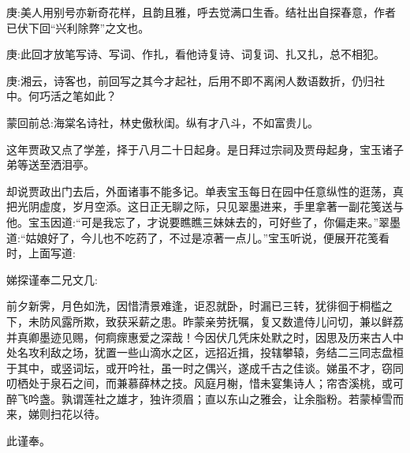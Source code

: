 
\begin{parag}
    \begin{note}庚:美人用别号亦新奇花样，且韵且雅，呼去觉满口生香。结社出自探春意，作者已伏下回“兴利除弊”之文也。\end{note}
\end{parag}


\begin{parag}
    \begin{note}庚:此回才放笔写诗、写词、作扎，看他诗复诗、词复词、扎又扎，总不相犯。\end{note}
\end{parag}


\begin{parag}
    \begin{note}庚:湘云，诗客也，前回写之其今才起社，后用不即不离闲人数语数折，仍归社中。何巧活之笔如此？\end{note}
\end{parag}


\begin{parag}
    \begin{note}蒙回前总:海棠名诗社，林史傲秋闺。纵有才八斗，不如富贵儿。\end{note}
\end{parag}


\begin{parag}
    这年贾政又点了学差，择于八月二十日起身。是日拜过宗祠及贾母起身，宝玉诸子弟等送至洒泪亭。
\end{parag}


\begin{parag}
    却说贾政出门去后，外面诸事不能多记。单表宝玉每日在园中任意纵性的逛荡，真把光阴虚度，岁月空添。这日正无聊之际，只见翠墨进来，手里拿著一副花笺送与他。宝玉因道:“可是我忘了，才说要瞧瞧三妹妹去的，可好些了，你偏走来。”翠墨道:“姑娘好了，今儿也不吃药了，不过是凉著一点儿。”宝玉听说，便展开花笺看时，上面写道:
\end{parag}


\begin{qute}
    娣探谨奉二兄文几:
    \begin{parag}
        前夕新霁，月色如洗，因惜清景难逢，讵忍就卧，时漏已三转，犹徘徊于桐槛之下，未防风露所欺，致获采薪之患。昨蒙亲劳抚嘱，复又数遣侍儿问切，兼以鲜荔并真卿墨迹见赐，何痌瘝惠爱之深哉！今因伏几凭床处默之时，因思及历来古人中处名攻利敌之场，犹置一些山滴水之区，远招近揖，投辖攀辕，务结二三同志盘桓于其中，或竖词坛，或开吟社，虽一时之偶兴，遂成千古之佳谈。娣虽不才，窃同叨栖处于泉石之间，而兼慕薛林之技。风庭月榭，惜未宴集诗人；帘杏溪桃，或可醉飞吟盏。孰谓莲社之雄才，独许须眉；直以东山之雅会，让余脂粉。若蒙棹雪而来，娣则扫花以待。
    \end{parag}
    \begin{parag}
        此谨奉。
    \end{parag}
\end{qute}


